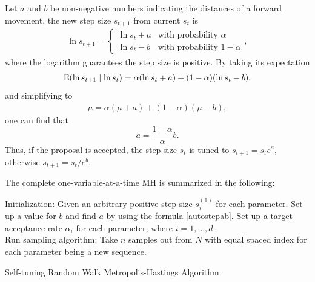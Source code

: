 Let $a$ and $b$ be non-negative numbers indicating the distances of a forward movement, the new step size $s_{t+1}$ from current $s_t$ is 
\begin{align}\ln s_{t+1} = 
\begin{cases}
\ln s_t + a & \mbox{with probability } \alpha \\
\ln s_t - b & \mbox{with probability } 1 - \alpha 
\end{cases},
\end{align}
where the logarithm guarantees the step size is positive. 
By taking its expectation  
\begin{align*}
\mathrm{E}(\ln s_{t+1}\mid \ln s_t) = \alpha(\ln s_t+a) + (1-\alpha)(\ln s_t-b), 
\end{align*}
and simplifying to 
\begin{align*}
\mu= \alpha(\mu+a) + (1-\alpha)(\mu-b), 
\end{align*}
one can find that 
\begin{equation}\label{autostepab}
a = \frac{1-\alpha}{\alpha}  b. 
\end{equation}
Thus, if the proposal is accepted, the step size $s_t$ is tuned to $s_{t+1}=s_te^a$, otherwise $s_{t+1}=s_t/e^b$. 

The complete one-variable-at-a-time MH is summarized in the following: 
\begin{algorithm}[h]
Initialization: Given an arbitrary positive step size $s_i^{(1)}$ for each parameter. Set up a value for $b$ and find $a$ by using the formula \eqref{autostepab}. Set up a target acceptance rate $\alpha_i$ for each parameter, where $i = 1,\dots, d$. \\
Run sampling algorithm: 
Take $n$ samples out from $N$ with equal spaced index for each parameter being a new sequence. 
\caption{Self-tuning Random Walk Metropolis-Hastings Algorithm}\label{algoonevarible}
\end{algorithm}


